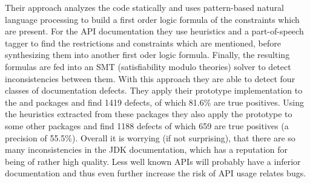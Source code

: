 Their approach analyzes the code statically and uses pattern-based natural language processing to build a first order logic formula of the constraints which are present.
For the API documentation they use heuristics and a part-of-speech tagger to find the restrictions and constraints which are mentioned, before synthesizing them into another first oder logic formula.
Finally, the resulting formulas are fed into an SMT (satisfiability modulo theories) solver \cite{barrett2009satisfiability} to detect inconsistencies between them.
With this approach they are able to detect four classes of documentation defects.
They apply their prototype implementation to the  and  packages and find 1419 defects, of which 81.6\% are true positives.
Using the heuristics extracted from these packages they also apply the prototype to some other packages and find 1188 defects of which 659 are true positives (a precision of 55.5\%).
Overall it is worrying (if not surprising), that there are so many inconsistencies in the JDK documentation, which has a reputation for being of rather high quality.
Less well known APIs will probably have a inferior documentation and thus even further increase the risk of API usage relates bugs.


